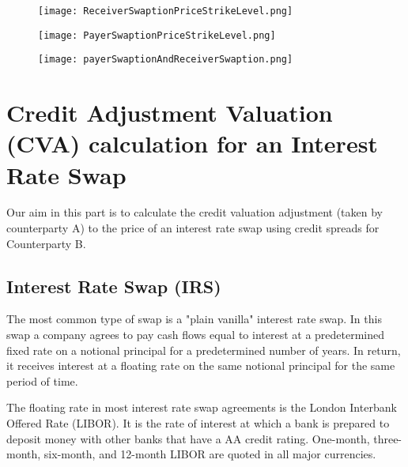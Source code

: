 \documentclass[11pt]{article}
\numberwithin{equation}{subsection}
\begin{document}
\begin{figure}[H]
	\texttt{[image: ReceiverSwaptionPriceStrikeLevel.png]}
\end{figure}

\begin{figure}[H]
	\texttt{[image: PayerSwaptionPriceStrikeLevel.png]}
\end{figure}


\begin{figure}[H]
	\texttt{[image: payerSwaptionAndReceiverSwaption.png]}
\end{figure}


\newpage
\section{Credit Adjustment Valuation (CVA) calculation for an Interest Rate Swap}
Our aim in this part is to calculate the credit valuation adjustment (taken by counterparty A) to the price of an interest rate swap using credit spreads for Counterparty B.\\

\subsection{Interest Rate Swap (IRS)}
The most common type of swap is a "plain vanilla" interest rate swap. In this swap a
company agrees to pay cash flows equal to interest at a predetermined fixed rate on a
notional principal for a predetermined number of years. In return, it receives interest at
a floating rate on the same notional principal for the same period of time.

The floating rate in most interest rate swap agreements is the London Interbank Offered
Rate (LIBOR). It is the rate of interest at which a bank is prepared to deposit money with other banks that have a AA credit rating. One-month, three-month, six-month, and 12-month LIBOR are quoted in all major currencies.
\end{document}
